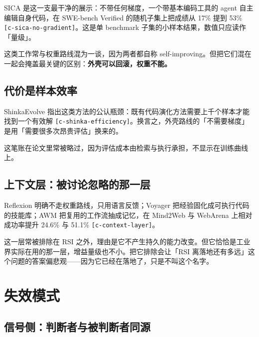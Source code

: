 SICA 是这一支最干净的展示：不带任何梯度，一个带基本编码工具的 agent 自主编辑自身代码，在 SWE-bench Verified 的随机子集上把成绩从 17\% 提到 53\% {\scriptsize\texttt{[c-\hspace{0pt}sica-\hspace{0pt}no-\hspace{0pt}gradient]}}。这是单 benchmark 子集的小样本结果，数值只应读作「量级」。


这类工作常与权重路线混为一谈，因为两者都自称 self-improving。但把它们混在一起会掩盖最关键的区别：\textbf{外壳可以回滚，权重不能。}


\subsection{代价是样本效率}

ShinkaEvolve 指出这类方法的公认瓶颈：既有代码演化方法需要上千个样本才能找到一个有效解 {\scriptsize\texttt{[c-\hspace{0pt}shinka-\hspace{0pt}efficiency]}}。换言之，外壳路线的「不需要梯度」是用「需要很多次昂贵评估」换来的。


这笔账在论文里常被略过，因为评估成本由检索与执行承担，不显示在训练曲线上。


\subsection{上下文层：被讨论忽略的那一层}

Reflexion 明确不走权重路线，只用语言反馈；Voyager 把经验固化成可执行代码的技能库；AWM 把复用的工作流抽成记忆，在 Mind2Web 与 WebArena 上相对成功率提升 24.6\% 与 51.1\% {\scriptsize\texttt{[c-\hspace{0pt}context-\hspace{0pt}layer]}}。


这一层常被排除在 RSI 之外，理由是它不产生持久的能力改变。但它恰恰是工业界实际在用的那一层，增益量级也不小。把它排除会让「RSI 离落地还有多远」这个问题的答案偏悲观——因为它已经在落地了，只是不叫这个名字。


\section{失效模式}

\subsection{信号侧：判断者与被判断者同源}

